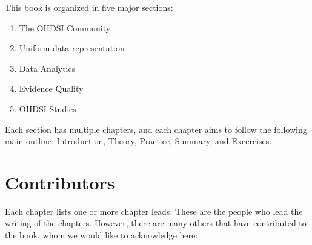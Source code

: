 \documentclass[11pt]{book}
\providecommand{\tightlist}{%
  \setlength{\itemsep}{0pt}\setlength{\parskip}{0pt}}
\theoremstyle{definition}
\theoremstyle{definition}
\theoremstyle{definition}
\theoremstyle{remark}
\begin{document}
This book is organized in five major sections:

\begin{enumerate}
\def\labelenumi{\Roman{enumi})}
\tightlist
\item
  The OHDSI Community
\item
  Uniform data representation
\item
  Data Analytics
\item
  Evidence Quality
\item
  OHDSI Studies
\end{enumerate}

Each section has multiple chapters, and each chapter aims to follow the following main outline: Introduction, Theory, Practice, Summary, and Excercises.

\hypertarget{contributors}{%
\section*{Contributors}\label{contributors}}

Each chapter lists one or more chapter leads. These are the people who lead the writing of the chapters. However, there are many others that have contributed to the book, whom we would like to acknowledge here:
\end{document}
